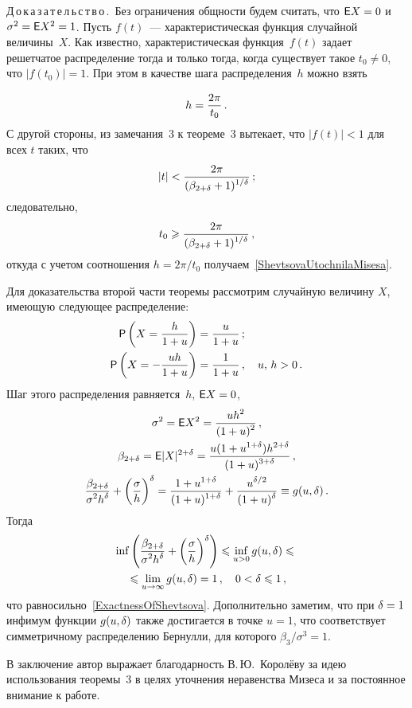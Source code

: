 \begin{multicols}{2}
\noindent
Д\,о\,к\,а\,з\,а\,т\,е\,л\,ь\,с\,т\,в\,о\,.\
Без ограничения общности будем считать, что ${\E X=0}$ и
${\sigma^2=\E X^2=1}$. Пусть $f(t)$~--- характеристическая функция
случайной величины~$X$. Как известно, характеристическая функция~$f(t)$
задает решетчатое распределение тогда и только тогда, когда
существует такое $t_0\neq0$, что $|f(t_0)|=1$. При этом в качестве
шага распределения~$h$ можно взять

\noindent
$$
h=\fr{2\pi}{t_0}\,.
$$
С другой стороны, из замечания~3 к
теореме~3 вытекает, что $|f(t)|<1$ для всех $t$ таких, что
$$
|t|<\fr{2\pi}{(\bet+1)^{1/\d}}\,;
$$
следовательно,
$$
t_0\ge \fr{2\pi}{(\bet+1)^{1/\d}}\,,
$$
откуда с учетом соотношения $h=2\pi/t_0$
получаем~\eqref{ShevtsovaUtochnilaMisesa}.

Для доказательства второй части теоремы рассмотрим случайную
величину $X$, имеющую следующее распределение:
\begin{align*}
\p\left(X=\fr{h}{1+u}\right)&=\fr{u}{1+u}\,;\\
\p\left(X=-\fr{uh}{1+u}\right)&=\fr{1}{1+u}\,,\quad u,\,h>0\,.
\end{align*}
Шаг этого распределения равняется~$h$, $\E X=0$,
\begin{gather*}
\sigma^2=\E X^2= \fr{u h^2}{(1+u)^2}\,,\\
\bet=\E|X|^{2+\d} =\fr{u(1+u^{1+\d})h^{2+\d}}{(1+u)^{3+\d}}\,,\\
\fr{\bet}{\sigma^2 h^\d} + \left(\fr{\sigma}{h}\right)^\d=
\fr{1+u^{1+\d}}{(1+u)^{1+\d}}+\fr{u^{\d/2}}{(1+u)^\d}\equiv
g(u,\d)\,.
\end{gather*}
Тогда
\begin{multline*}
\inf \left(\fr{\bet}{\sigma^2 h^\d} +
\left(\fr{\sigma}{h}\right)^\d\right)\le\inf_{u>0}
g(u,\d)\le{}\\
{}\le
\lim_{u\to\infty} g(u,\d) =1\,,\quad 0<\d\le 1\,,
\end{multline*}
что равносильно~\eqref{ExactnessOfShevtsova}. Дополнительно заметим,
что при $\d=1$ инфимум функции $g(u,\d)$ также достигается в точке
$u=1$, что соответствует сим\-мет\-рич\-но\-му распределению Бернулли, для
которого $\beta_3/\sigma^3=1$.
\medskip

В заключение автор выражает благодарность В.\,Ю.~Королёву за идею
использования теоремы~3 в целях уточнения неравенства
Мизеса и за постоянное внимание к работе.


{\small\frenchspacing
{%
\begin{thebibliography}{99}


\end{thebibliography}}}
\end{multicols}
